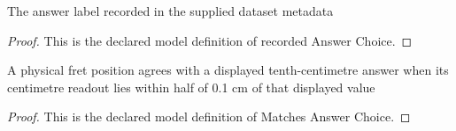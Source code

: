 \begin{definition}
  \label{def:physics:phyx-mini-0218:phyxminiproblems-problemphyxmini0218-recordedanswerchoice}
  The answer label recorded in the supplied dataset metadata
\end{definition}
\begin{proof}
  This is the declared model definition of recorded Answer Choice.
\end{proof}
\begin{definition}
  \label{def:physics:phyx-mini-0218:phyxminiproblems-problemphyxmini0218-matchesanswerchoice}
  A physical fret position agrees with a displayed tenth-centimetre answer when its centimetre readout lies within half of 0.1 cm of that displayed value
\end{definition}
\begin{proof}
  This is the declared model definition of Matches Answer Choice.
\end{proof}
